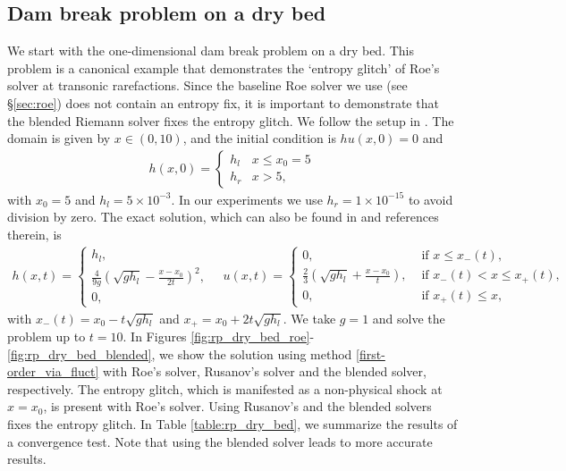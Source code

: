 \documentclass[preprint, 11pt]{article}
\begin{document}
\subsection{Dam break problem on a dry bed}\label{sec:rp_dry_bed}
We start with the one-dimensional dam break problem on a dry bed.
This problem is a canonical example that demonstrates the `entropy glitch' of Roe's solver
at transonic rarefactions. Since the baseline Roe solver we use (see \S\ref{sec:roe}) does not contain
an entropy fix, it is important to demonstrate that the blended Riemann solver fixes the entropy glitch.
We follow the setup in \cite[\S 4.1.2]{delestre2013swashes}.
The domain is given by $x\in(0,10)$, and the initial condition is $hu(x,0)=0$ and
\begin{align*}
  h(x,0)=
  \begin{cases}
    h_l & x\leq x_0=5 \\
    h_r & x >5,
  \end{cases}
\end{align*}
with $x_0=5$ and $h_l=5\times 10^{-3}$.  In our experiments we use $h_r=1\times
10^{-15}$ to avoid division by zero.
The exact solution, which can also be found in \cite{delestre2013swashes} and references therein, is
\begin{align*}
  h(x,t) =
  \begin{cases}
    h_l, \\
    \frac{4}{9g}\left(\sqrt{gh_l}-\frac{x-x_0}{2t}\right)^2, \\
    0,
  \end{cases}
\quad
  u(x,t) =
  \begin{cases}
    0, &\mbox{ if } x\leq x_-(t), \\
    \frac{2}{3}\left(\sqrt{gh_l}+\frac{x-x_0}{t}\right), & \mbox{ if } x_-(t) < x\leq x_+(t), \\
    0, &\mbox{ if } x_+(t)\leq x,
  \end{cases}
\end{align*}
with $x_-(t)=x_0 - t\sqrt{gh_l}$ and $x_+=x_0+2t\sqrt{gh_l}$.
We take $g=1$ and solve the problem up to $t=10$.
In Figures \ref{fig:rp_dry_bed_roe}-\ref{fig:rp_dry_bed_blended},
we show the solution using method \eqref{first-order_via_fluct}
with Roe's solver, Rusanov's solver and the blended solver, respectively.
The entropy glitch, which is manifested as a non-physical shock at $x=x_0$,
is present with Roe's solver. Using Rusanov's and the blended solvers
fixes the entropy glitch.
In Table \ref{table:rp_dry_bed}, we summarize the results of a convergence test.
Note that using the blended solver leads to more accurate results.
\end{document}
